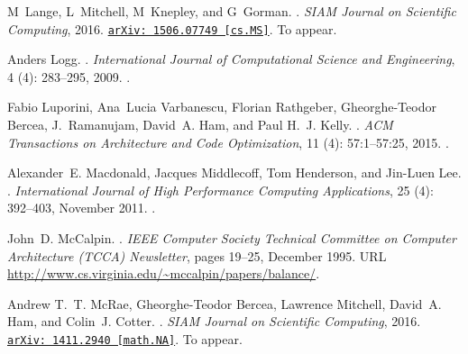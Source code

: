 \documentclass[11pt, a4paper]{scrartcl}
\begin{document}
\begin{thebibliography}{35}
M~Lange, L~Mitchell, M~Knepley, and G~Gorman.
.
\newblock \emph{SIAM Journal on Scientific Computing}, 2016.
\newblock
  \href{http://arxiv.org/abs/1506.07749}{{\small\texttt{arXiv:\,1506.07749
  [cs.MS]}}}.
\newblock To appear.

Anders Logg.
.
\newblock \emph{International Journal of Computational Science and
  Engineering}, 4 (4): 283--295, 2009.
\newblock {}.

Fabio Luporini, Ana~Lucia Varbanescu, Florian Rathgeber, Gheorghe-Teodor
  Bercea, J.~Ramanujam, David~A. Ham, and Paul H.~J. Kelly.
.
\newblock \emph{ACM Transactions on Architecture and Code Optimization},
  11 (4): 57:1--57:25, 2015.
\newblock {}.

Alexander~E. Macdonald, Jacques Middlecoff, Tom Henderson, and Jin-Luen Lee.
.
\newblock \emph{International Journal of High Performance Computing
  Applications}, 25 (4): 392--403, November 2011.
\newblock {}.

John~D. McCalpin.
.
\newblock \emph{IEEE Computer Society Technical Committee on Computer
  Architecture (TCCA) Newsletter}, pages 19--25, December 1995.
\newblock URL \url{http://www.cs.virginia.edu/~mccalpin/papers/balance/}.

Andrew T.~T. McRae, Gheorghe-Teodor Bercea, Lawrence Mitchell, David~A. Ham,
  and Colin~J. Cotter.
.
\newblock \emph{SIAM Journal on Scientific Computing}, 2016.
\newblock
  \href{http://arxiv.org/abs/1411.2940}{{\small\texttt{arXiv:\,1411.2940
  [math.NA]}}}.
\newblock To appear.


\end{thebibliography}
\end{document}
